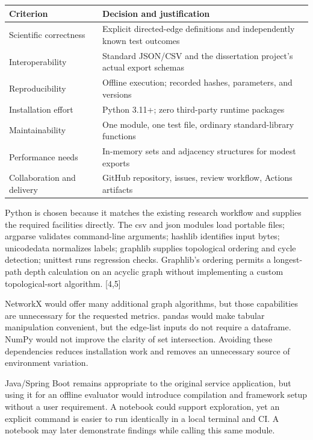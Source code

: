 \documentclass[12pt,a4paper]{article}
\newcommand{\source}[1]{\textnormal{[#1]}}
\begin{document}
\noindent\begin{tabularx}{\textwidth}{|p{3.7cm}|X|}\hline
\textbf{Criterion} & \textbf{Decision and justification} \\\hline
Scientific correctness & Explicit directed-edge definitions and independently known test outcomes \\\hline
Interoperability & Standard JSON/CSV and the dissertation project's actual export schemas \\\hline
Reproducibility & Offline execution; recorded hashes, parameters, and versions \\\hline
Installation effort & Python 3.11+; zero third-party runtime packages \\\hline
Maintainability & One module, one test file, ordinary standard-library functions \\\hline
Performance needs & In-memory sets and adjacency structures for modest exports \\\hline
Collaboration and delivery & GitHub repository, issues, review workflow, Actions artifacts \\\hline
\end{tabularx}

Python is chosen because it matches the existing research workflow and supplies the required facilities directly. The csv and json modules load portable files; argparse validates command-line arguments; hashlib identifies input bytes; unicodedata normalizes labels; graphlib supplies topological ordering and cycle detection; unittest runs regression checks. Graphlib's ordering permits a longest-path depth calculation on an acyclic graph without implementing a custom topological-sort algorithm. \source{4,5}

NetworkX would offer many additional graph algorithms, but those capabilities are unnecessary for the requested metrics. pandas would make tabular manipulation convenient, but the edge-list inputs do not require a dataframe. NumPy would not improve the clarity of set intersection. Avoiding these dependencies reduces installation work and removes an unnecessary source of environment variation.

Java/Spring Boot remains appropriate to the original service application, but using it for an offline evaluator would introduce compilation and framework setup without a user requirement. A notebook could support exploration, yet an explicit command is easier to run identically in a local terminal and CI. A notebook may later demonstrate findings while calling this same module.
\end{document}
